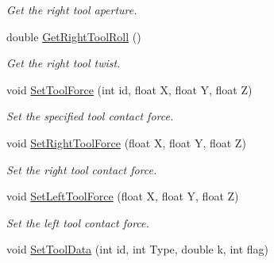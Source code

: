 \begin{DoxyCompactItemize}
\begin{DoxyCompactList}\small\item\em Get the right tool aperture. \item\end{DoxyCompactList}\item 
\hypertarget{classvtkLSW_a906fb3449cf1d80813b122df7e7a2d97}{
double \hyperlink{classvtkLSW_a906fb3449cf1d80813b122df7e7a2d97}{GetRightToolRoll} ()}
\label{classvtkLSW_a906fb3449cf1d80813b122df7e7a2d97}

\begin{DoxyCompactList}\small\item\em Get the right tool twist. \item\end{DoxyCompactList}\item 
\hypertarget{classvtkLSW_aa44f09ba653c56aec5923afee858dcfa}{
void \hyperlink{classvtkLSW_aa44f09ba653c56aec5923afee858dcfa}{SetToolForce} (int id, float X, float Y, float Z)}
\label{classvtkLSW_aa44f09ba653c56aec5923afee858dcfa}

\begin{DoxyCompactList}\small\item\em Set the specified tool contact force. \item\end{DoxyCompactList}\item 
\hypertarget{classvtkLSW_a737826471233bb757441dd09c6fc1469}{
void \hyperlink{classvtkLSW_a737826471233bb757441dd09c6fc1469}{SetRightToolForce} (float X, float Y, float Z)}
\label{classvtkLSW_a737826471233bb757441dd09c6fc1469}

\begin{DoxyCompactList}\small\item\em Set the right tool contact force. \item\end{DoxyCompactList}\item 
\hypertarget{classvtkLSW_af67b7c7d9118380eec8aed8235de4a64}{
void \hyperlink{classvtkLSW_af67b7c7d9118380eec8aed8235de4a64}{SetLeftToolForce} (float X, float Y, float Z)}
\label{classvtkLSW_af67b7c7d9118380eec8aed8235de4a64}

\begin{DoxyCompactList}\small\item\em Set the left tool contact force. \item\end{DoxyCompactList}\item 
\hypertarget{classvtkLSW_aceb6a08a668b9baf90e35e9cdfdc8b82}{
void \hyperlink{classvtkLSW_aceb6a08a668b9baf90e35e9cdfdc8b82}{SetToolData} (int id, int Type, double k, int flag)}
\label{classvtkLSW_aceb6a08a668b9baf90e35e9cdfdc8b82}


\end{DoxyCompactItemize}

